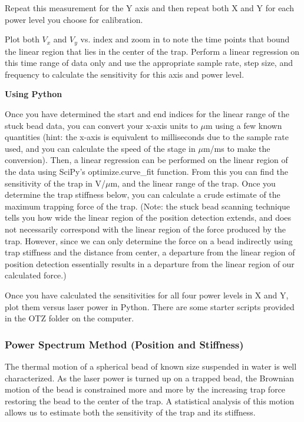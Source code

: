 \documentclass{../lab}
\begin{document}
Repeat this measurement for the Y axis and then repeat both X and Y for each power level you choose for calibration.

Plot both $V_x$ and $V_y$ vs. index and zoom in to note the time points that bound the linear region that lies in the center of the trap. Perform a linear regression on this time range of data only and use the appropriate sample rate, step size, and frequency to calculate the sensitivity for this axis and power level.

\textbf{Using Python}

Once you have determined the start and end indices for the linear range of the stuck bead data, you can convert your x-axis units to $\mu$m using a few known quantities (hint: the x-axis is equivalent to milliseconds due to the sample rate used, and you can calculate the speed of the stage in $\mu$m/ms to make the conversion). Then, a linear regression can be performed on the linear region of the data using SciPy's optimize.curve\_fit function. From this you can find the sensitivity of the trap in V/$\mu$m, and the linear range of the trap. Once you determine the trap stiffness below, you can calculate a crude estimate of the maximum trapping force of the trap. (Note: the stuck bead scanning technique tells you how wide the linear region of the position detection extends, and does not necessarily correspond with the linear region of the force produced by the trap. However, since we can only determine the force on a bead indirectly using trap stiffness and the distance from center, a departure from the linear region of position detection essentially results in a departure from the linear region of our calculated force.)

Once you have calculated the sensitivities for all four power levels in X and Y, plot them versus laser power in Python. There are some starter scripts provided in the OTZ folder on the computer.


\subsubsection{Power Spectrum Method (Position and Stiffness)}

The thermal motion of a spherical bead of known size suspended in water is well characterized. As the laser power is turned up on a trapped bead, the Brownian motion of the bead is constrained more and more by the increasing trap force restoring the bead to the center of the trap. A statistical analysis of this motion allows us to estimate both the sensitivity of the trap and its stiffness.
\end{document}
